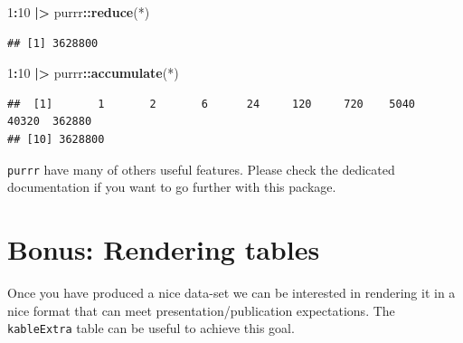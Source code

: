 \documentclass[
]{book}
\newenvironment{Shaded}{\begin{snugshade}}{\end{snugshade}}
\newcommand{\AttributeTok}[1]{\textcolor[rgb]{0.13,0.29,0.53}{#1}}
\newcommand{\DecValTok}[1]{\textcolor[rgb]{0.00,0.00,0.81}{#1}}
\newcommand{\FunctionTok}[1]{\textcolor[rgb]{0.13,0.29,0.53}{\textbf{#1}}}
\newcommand{\NormalTok}[1]{#1}
\newcommand{\SpecialCharTok}[1]{\textcolor[rgb]{0.81,0.36,0.00}{\textbf{#1}}}
\newcommand{\StringTok}[1]{\textcolor[rgb]{0.31,0.60,0.02}{#1}}
\begin{document}
\begin{Shaded}
\begin{Highlighting}[]
\DecValTok{1}\SpecialCharTok{:}\DecValTok{10} \SpecialCharTok{|\textgreater{}}\NormalTok{ purrr}\SpecialCharTok{::}\FunctionTok{reduce}\NormalTok{(}\StringTok{\textasciigrave{}}\AttributeTok{*}\StringTok{\textasciigrave{}}\NormalTok{)}
\end{Highlighting}
\end{Shaded}

\begin{verbatim}
## [1] 3628800
\end{verbatim}

\begin{Shaded}
\begin{Highlighting}[]
\DecValTok{1}\SpecialCharTok{:}\DecValTok{10} \SpecialCharTok{|\textgreater{}}\NormalTok{ purrr}\SpecialCharTok{::}\FunctionTok{accumulate}\NormalTok{(}\StringTok{\textasciigrave{}}\AttributeTok{*}\StringTok{\textasciigrave{}}\NormalTok{)}
\end{Highlighting}
\end{Shaded}

\begin{verbatim}
##  [1]       1       2       6      24     120     720    5040   40320  362880
## [10] 3628800
\end{verbatim}

\texttt{purrr} have many of others useful features. Please check the dedicated documentation if you want to go further with this package.

\section{Bonus: Rendering tables}\label{bonus-rendering-tables}

Once you have produced a nice data-set we can be interested in rendering it in a nice format that can meet presentation/publication expectations. The \texttt{kableExtra} table can be useful to achieve this goal.
\end{document}
